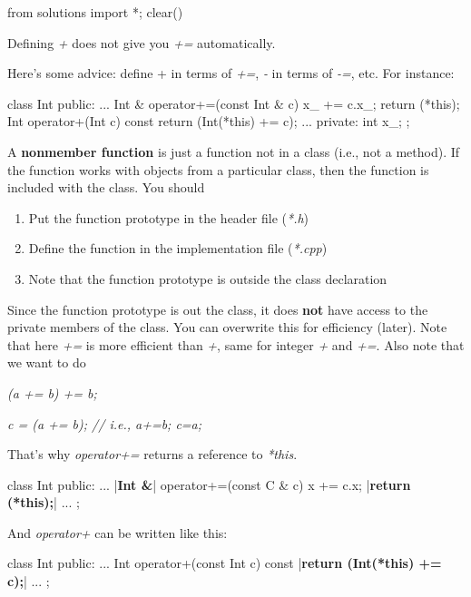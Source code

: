 \begin{python0}
from solutions import *; clear()
\end{python0}

Defining \textit{+} does not give you \textit{+=} automatically.

Here's some advice: define + in terms of \textit{+=},
\textit{-} in terms of \textit{-=}, etc. For instance:

\begin{consolethree}[escapeinside=||]
class Int
{
public:
    ...
    Int & operator+=(const Int & c)
    {
        x_ += c.x_;
        return (*this);
    }
    Int operator+(Int c) const
    {
        return (Int(*this) += c);
    }
    ...
private:
    int x_;
};
\end{consolethree}

A \textbf{nonmember function} is just a function not in a class (i.e.,
not a method). If the function works with objects from a particular
class, then the function is included with the class. You should

\begin{enumerate}
\item Put the function prototype in the header file (\textit{*.h})
\item Define the function in the implementation file (\textit{*.cpp})
\item Note that the function prototype is outside the class declaration
\end{enumerate}

Since the function prototype is out the class, it does \textbf{not} have
access to the private members of the class. You can overwrite this for
efficiency (later). Note that here \textit{+=} is more efficient than \textit{+}, same
for integer \textit{+} and \textit{+=}. Also note that we want to do

\textit{(a += b) += b;}

\textit{c = (a += b); // i.e., a+=b; c=a;}

That's why \textit{operator+=} returns a reference to
\textit{*this}.

\begin{consolethree}[escapeinside=||]
class Int
{
public:
    ...
    |{\bf Int \&}| operator+=(const C & c)
    {
        x += c.x;
        |{\bf return (*this);}|
    }
    ...
};
\end{consolethree}

And \textit{operator+} can be written like this:

\begin{consolethree}[escapeinside=||]
class Int
{
public:
    ...
    Int operator+(const Int c) const
    {
        |{\bf return (Int(*this) += c);}|
    }
    ...
};
\end{consolethree}



